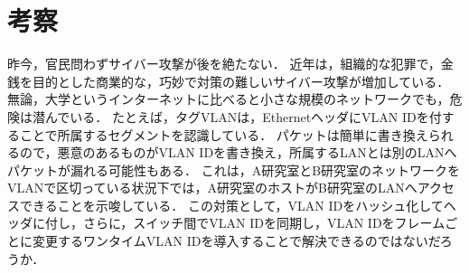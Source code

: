 \section{考察}
昨今，官民問わずサイバー攻撃が後を絶たない．
近年は，組織的な犯罪で，金銭を目的とした商業的な，巧妙で対策の難しいサイバー攻撃が増加している\cite{動的ネットワーク構成によるサイバー攻撃対策支援手法の研究}．
無論，大学というインターネットに比べると小さな規模のネットワークでも，危険は潜んでいる．
たとえば，タグVLANは，EthernetヘッダにVLAN IDを付することで所属するセグメントを認識している．
パケットは簡単に書き換えられるので，悪意のあるものがVLAN IDを書き換え，所属するLANとは別のLANへパケットが漏れる可能性もある．
これは，A研究室とB研究室のネットワークをVLANで区切っている状況下では，A研究室のホストがB研究室のLANへアクセスできることを示唆している．
この対策として，VLAN IDをハッシュ化してヘッダに付し，さらに，スイッチ間でVLAN IDを同期し，VLAN IDをフレームごとに変更するワンタイムVLAN IDを導入することで解決できるのではないだろうか．
